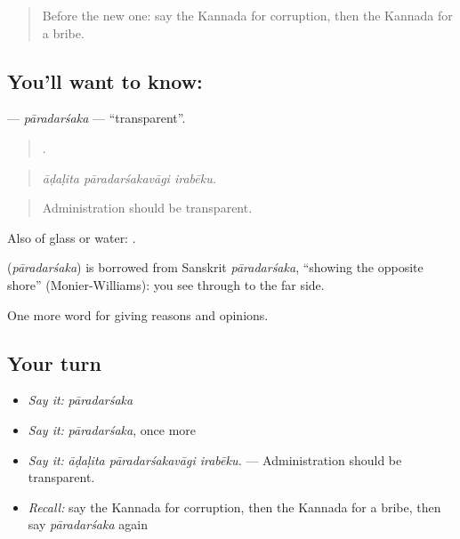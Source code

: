 \label{lesson:KA-C402-paradarsaka}



\begin{quote}
Before the new one: say the Kannada for corruption, then the Kannada for a bribe.
\end{quote}

\subsection*{You'll want to know: }
\textbf{} — \emph{pāradarśaka} — \textquotedblleft{}transparent\textquotedblright{}.

\begin{quote}
  .
\end{quote}

\begin{quote}
\emph{āḍaḷita pāradarśakavāgi irabēku.}
\end{quote}

\begin{quote}
Administration should be transparent.
\end{quote}

Also of glass or water:  .

\begin{cousinweb}
\textbf{} (\emph{pāradarśaka}) is borrowed from Sanskrit \emph{pāradarśaka}, \textquotedblleft{}showing the opposite shore\textquotedblright{} (Monier-Williams): you see through to the far side.
\end{cousinweb}

\begin{grammarlens}[title={What you've built}]
One more word for giving reasons and opinions.
\end{grammarlens}

\subsection*{Your turn}
\begin{itemize}
\raggedright
  \item \emph{Say it:} \emph{pāradarśaka}
  \item \emph{Say it:} \emph{pāradarśaka}, once more
  \item \emph{Say it:} \emph{āḍaḷita pāradarśakavāgi irabēku.} — Administration should be transparent.
  \item \emph{Recall:} say the Kannada for corruption, then the Kannada for a bribe, then say \emph{pāradarśaka} again
\end{itemize}

